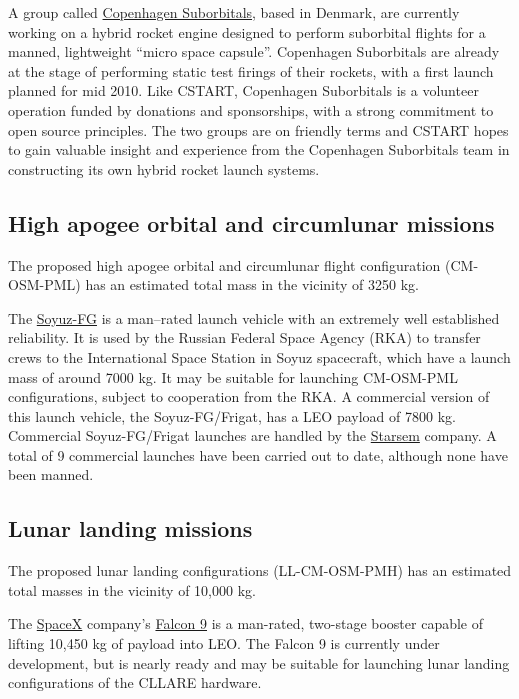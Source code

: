 \documentclass{report}
\begin{document}
A group called \href{http://www.copenhagensuborbitals.com/}{Copenhagen Suborbitals}, based in Denmark, are currently working on a hybrid rocket engine designed to perform suborbital flights for a manned, lightweight ``micro space capsule''.  Copenhagen Suborbitals are already at the stage of performing static test firings of their rockets, with a first launch planned for mid 2010.  Like CSTART, Copenhagen Suborbitals is a volunteer operation funded by donations and sponsorships, with a strong commitment to open source principles.  The two groups are on friendly terms and CSTART hopes to gain valuable insight and experience from the Copenhagen Suborbitals team in constructing its own hybrid rocket launch systems.

\subsection{High apogee orbital and circumlunar missions}

The proposed high apogee orbital and circumlunar flight configuration (CM-OSM-PML) has an estimated total mass in the vicinity of 3250 kg.

The \href{http://en.wikipedia.org/wiki/Soyuz-FG}{Soyuz-FG} is a man--rated launch vehicle with an extremely well established reliability.  It is used by the Russian Federal Space Agency (RKA) to transfer crews to the International Space Station in Soyuz spacecraft, which have a launch mass of around 7000 kg.  It may be suitable for launching CM-OSM-PML configurations, subject to cooperation from the RKA.  A commercial version of this launch vehicle, the Soyuz-FG/Frigat, has a LEO payload of 7800 kg.  Commercial Soyuz-FG/Frigat launches are handled by the \href{http://www.starsem.com}{Starsem} company.  A total of 9 commercial launches have been carried out to date, although none have been manned.

\subsection{Lunar landing missions}

The proposed lunar landing configurations (LL-CM-OSM-PMH) has an estimated total masses in the vicinity of 10,000 kg.

The \href{http://spacex.com}{SpaceX} company's \href{http://spacex.com/falcon9.php}{Falcon 9} is a man-rated, two-stage booster capable of lifting 10,450 kg of payload into LEO.  The Falcon 9 is currently under development, but is nearly ready and may be suitable for launching lunar landing configurations of the CLLARE hardware.
\end{document}
